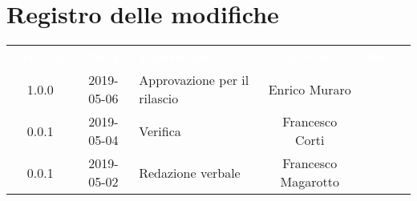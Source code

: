 \section*{Registro delle modifiche}
{
	\renewcommand{\arraystretch}{1.5}
	\centering
	\begin{longtable}{ c c  C{4cm}  c  c }
		
		\textcolor{white}{\textbf{Versione}} & \textcolor{white}{\textbf{Data}} & \textcolor{white}{\textbf{Descrizione}} & \textcolor{white}{\textbf{Autore}} & \textcolor{white}{\textbf{Ruolo}}\\
		1.0.0 & 2019-05-06 & Approvazione per il rilascio & Enrico Muraro & \Res{}\\
		0.0.1 & 2019-05-04 & Verifica & Francesco Corti & \ver{}\\
		0.0.1 & 2019-05-02 & Redazione verbale & Francesco Magarotto & \reda{}\\
		
		
	\end{longtable}
	
}